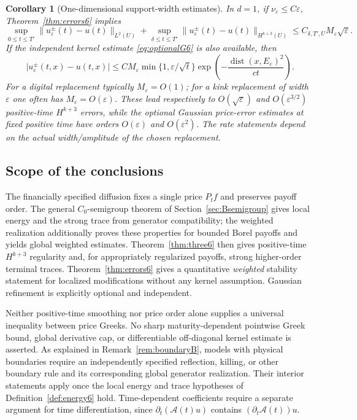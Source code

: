 \documentclass[11pt,a4paper]{article}
\newtheorem{corollary}[theorem]{Corollary}
\theoremstyle{definition}\newtheorem{definition}{Definition}[section]\newtheorem{example}[theorem]{Example}
\theoremstyle{remark}\newtheorem{remark}[theorem]{Remark}\newtheorem{remarkSix}{Remark}[section]
\newcommand{\norm}[1]{\lVert #1\rVert}
\newcommand{\abs}[1]{\lvert #1\rvert}
\newcommand{\cA}{\mathcal A}
\begin{document}
\begin{corollary}[One-dimensional support-width estimates]\label{cor:width6}
In $d=1$, if $\nu_\varepsilon\le C\varepsilon$, Theorem~\ref{thm:errors6} implies
\begin{equation}\label{eq:oneD6}
 \sup_{0\le t\le T'}\norm{u_\varepsilon^\pm(t)-u(t)}_{L^2(U)}
 +\sup_{\delta\le t\le T'}\norm{u_\varepsilon^\pm(t)-u(t)}_{H^{k+3}(U)}
 \le C_{\delta,T',U} M_\varepsilon\sqrt\varepsilon.
\end{equation}
If the independent kernel estimate \eqref{eq:optionalG6} is also available, then
\begin{equation}\label{eq:oneDG6}
 \abs{u_\varepsilon^\pm(t,x)-u(t,x)}
 \le CM_\varepsilon\min\{1,\varepsilon/\sqrt t\}
 \exp\!\left(-\frac{\operatorname{dist}(x,E_\varepsilon)^2}{ct}\right).
\end{equation}
For a digital replacement typically $M_\varepsilon=O(1)$; for a kink replacement of width $\varepsilon$ one often has $M_\varepsilon=O(\varepsilon)$. These lead respectively to $O(\sqrt\varepsilon)$ and $O(\varepsilon^{3/2})$ positive-time $H^{k+3}$ errors, while the optional Gaussian price-error estimates at fixed positive time have orders $O(\varepsilon)$ and $O(\varepsilon^2)$. The rate statements depend on the actual width/amplitude of the chosen replacement.
\end{corollary}

\subsection{Scope of the conclusions}
\label{subsec:scope6}
The financially specified diffusion fixes a single price $P_tf$ and preserves payoff order. The general $C_0$-semigroup theorem of Section~\ref{sec:Bsemigroup} gives local energy and the strong trace from generator compatibility; the weighted realization additionally proves these properties for bounded Borel payoffs and yields global weighted estimates. Theorem~\ref{thm:three6} then gives positive-time $H^{k+3}$ regularity and, for appropriately regularized payoffs, strong higher-order terminal traces. Theorem~\ref{thm:errors6} gives a quantitative \emph{weighted} stability statement for localized modifications without any kernel assumption. Gaussian refinement is explicitly optional and independent.

Neither positive-time smoothing nor price order alone supplies a universal inequality between price Greeks. No sharp maturity-dependent pointwise Greek bound, global derivative cap, or differentiable off-diagonal kernel estimate is asserted. As explained in Remark~\ref{rem:boundaryB}, models with physical boundaries require an independently specified reflection, killing, or other boundary rule and its corresponding global generator realization. Their interior statements apply once the local energy and trace hypotheses of Definition~\ref{def:energy6} hold. Time-dependent coefficients require a separate argument for time differentiation, since $\partial_t(\cA(t)u)$ contains $(\partial_t\cA(t))u$.
\end{document}
